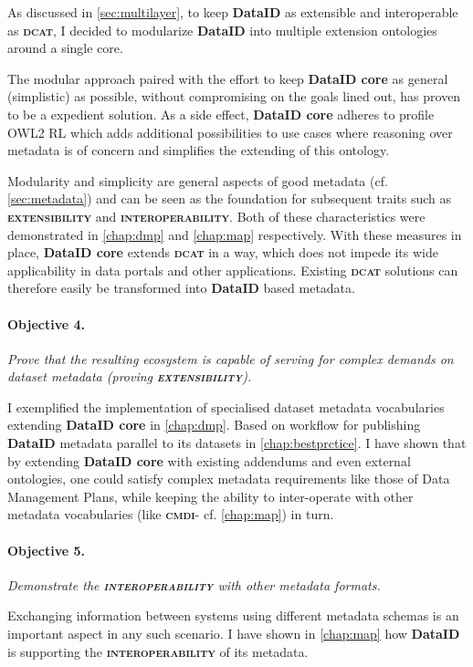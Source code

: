 \documentclass[a4paper,english,twoside,BCOR1.5cm,headsepline,DIV12,appendixprefix,final,12pt]{scrbook}
\newcommand{\extensibility}{{\ttfamily\scshape\bfseries extensibility}\xspace}
\newcommand{\interoperability}{{\ttfamily\scshape\bfseries interoperability}\xspace}
\newcommand{\dataid}{{\ttfamily\bfseries DataID}\xspace}
\newcommand{\core}{{\ttfamily\bfseries DataID core}\xspace}
\newcommand{\cmdi}{{\scshape\bfseries cmdi}\xspace}
\newcommand{\dcat}{{\scshape\bfseries dcat}\xspace}
\begin{document}
As discussed in \cref{sec:multilayer}, to keep \dataid as extensible and interoperable as \dcat, I decided to modularize \dataid into multiple extension ontologies around a single core. 

The modular approach paired with the effort to keep \core as general (simplistic) as possible, without compromising on the goals lined out, has proven to be a expedient solution. As a side effect, \core adheres to profile OWL2 RL which adds additional possibilities to use cases where reasoning over metadata is of concern and simplifies the extending of this ontology.

Modularity and simplicity are general aspects of good metadata (cf. \cref{sec:metadata}) and can be seen as the foundation for subsequent traits such as \extensibility and \interoperability. Both of these characteristics were demonstrated in \cref{chap:dmp} and \cref{chap:map} respectively. With these measures in place, \core extends \dcat in a way, which does not impede its wide applicability in data portals and other applications. Existing \dcat solutions can therefore easily be transformed into \dataid based metadata. 

\paragraph{Objective 4.} \textit{Prove that the resulting ecosystem is capable of serving for complex demands on dataset metadata (proving \extensibility).}

I exemplified the implementation of specialised dataset metadata vocabularies extending \core in \cref{chap:dmp}. Based on workflow for publishing \dataid metadata parallel to its datasets in \cref{chap:bestprctice}. I have shown that by extending \core with existing addendums and even external ontologies, one could satisfy complex metadata requirements like those of Data Management Plans, while keeping the ability to inter-operate with other metadata vocabularies (like \cmdi - cf. \cref{chap:map}) in turn.

\paragraph{Objective 5.} \textit{Demonstrate the \interoperability with other metadata formats.}

Exchanging information between systems using different metadata schemas is an important aspect in any such scenario. I have shown in \cref{chap:map} how \dataid is supporting the \interoperability of its metadata. 
\end{document}
